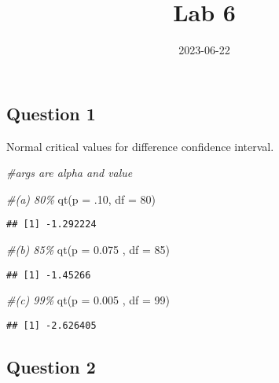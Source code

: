 \documentclass[
]{article}
\title{Lab 6}
\author{}
\date{\vspace{-2.5em}2023-06-22}
\newenvironment{Shaded}{\begin{snugshade}}{\end{snugshade}}
\newcommand{\AttributeTok}[1]{\textcolor[rgb]{0.77,0.63,0.00}{#1}}
\newcommand{\CommentTok}[1]{\textcolor[rgb]{0.56,0.35,0.01}{\textit{#1}}}
\newcommand{\DecValTok}[1]{\textcolor[rgb]{0.00,0.00,0.81}{#1}}
\newcommand{\FloatTok}[1]{\textcolor[rgb]{0.00,0.00,0.81}{#1}}
\newcommand{\FunctionTok}[1]{\textcolor[rgb]{0.00,0.00,0.00}{#1}}
\newcommand{\NormalTok}[1]{#1}
\begin{document}
\maketitle

\hypertarget{question-1}{%
\subsection{Question 1}\label{question-1}}

Normal critical values for difference confidence interval.

\begin{Shaded}
\begin{Highlighting}[]
\CommentTok{\#args are alpha and value}

\CommentTok{\#(a) 80\%}
\FunctionTok{qt}\NormalTok{(}\AttributeTok{p =}\NormalTok{ .}\DecValTok{10}\NormalTok{, }\AttributeTok{df =} \DecValTok{80}\NormalTok{)}
\end{Highlighting}
\end{Shaded}

\begin{verbatim}
## [1] -1.292224
\end{verbatim}

\begin{Shaded}
\begin{Highlighting}[]
\CommentTok{\#(b) 85\%}
\FunctionTok{qt}\NormalTok{(}\AttributeTok{p =} \FloatTok{0.075}\NormalTok{ , }\AttributeTok{df =} \DecValTok{85}\NormalTok{)}
\end{Highlighting}
\end{Shaded}

\begin{verbatim}
## [1] -1.45266
\end{verbatim}

\begin{Shaded}
\begin{Highlighting}[]
\CommentTok{\#(c) 99\% }
\FunctionTok{qt}\NormalTok{(}\AttributeTok{p =}  \FloatTok{0.005}\NormalTok{ , }\AttributeTok{df =} \DecValTok{99}\NormalTok{)}
\end{Highlighting}
\end{Shaded}

\begin{verbatim}
## [1] -2.626405
\end{verbatim}

\hypertarget{question-2}{%
\subsection{Question 2}\label{question-2}}
\end{document}
